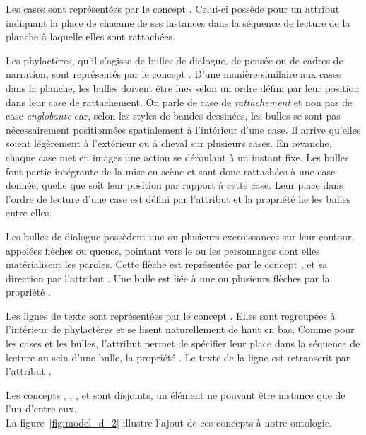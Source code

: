 Les cases sont représentées par le concept .
Celui-ci possède pour un attribut  indiquant la place de chacune de ses instances dans la séquence de lecture de la planche à laquelle elles sont rattachées.

Les phylactères, qu'il s'agisse de bulles de dialogue, de pensée ou de cadres de narration, sont représentés par le concept .
D'une manière similaire aux cases dans la planche, les bulles doivent être lues selon un ordre défini par leur position dans leur case de rattachement.
On parle de case de \emph{rattachement} et non pas de case \emph{englobante} car, selon les styles de bandes dessinées, les bulles se sont pas nécessairement positionnées spatialement à l'intérieur d'une case.
Il arrive qu'elles soient légèrement à l'extérieur ou à cheval sur plusieurs cases.
En revanche, chaque case met en images une action se déroulant à un instant fixe.
Les bulles font partie intégrante de la mise en scène et sont donc rattachées à une case donnée, quelle que soit leur position par rapport à cette case.
Leur place dans l'ordre de lecture d'une case est défini par l'attribut  et la propriété  lie les bulles entre elles.

Les bulles de dialogue possèdent une ou plusieurs excroissances sur leur contour, appelées flèches ou queues, pointant vers le ou les personnages dont elles matérialisent les paroles.
Cette flèche est représentée par le concept , et sa direction par l'attribut .
Une bulle est liée à une ou plusieurs flèches par la propriété .


Les lignes de texte sont représentées par le concept .
Elles sont regroupées à l'intérieur de phylactères et se lisent naturellement de haut en bas.
Comme pour les cases et les bulles, l'attribut  permet de spécifier leur place dans la séquence de lecture au sein d'une bulle, la propriété .
Le texte de la ligne est retranscrit par l'attribut .


Les concepts , , 
, 
 et  sont disjoints, un élément ne pouvant être instance que de l'un d'entre eux.\\

La figure~\ref{fig:model_d_2} illustre l'ajout de ces concepts à notre ontologie.\\

